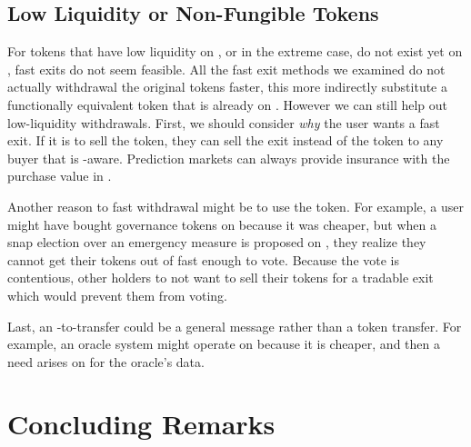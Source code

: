 \subsection{Low Liquidity or Non-Fungible Tokens}

For tokens that have low liquidity on \layerone, or in the extreme case, do not exist yet on \layerone, fast exits do not seem feasible. All the fast exit methods we examined do not actually withdrawal the original tokens faster, this more indirectly substitute a functionally equivalent token that is already on \layerone. However we can still help out low-liquidity withdrawals. First, we should consider \textit{why} the user wants a fast exit. If it is to sell the token, they can sell the exit instead of the token to any buyer that is \layertwo-aware. Prediction markets can always provide insurance with the purchase value in \fail. 

Another reason to fast withdrawal might be to use the token. For example, a user might have bought governance tokens on \layertwo because it was cheaper, but when a snap election over an emergency measure is proposed on \layerone, they realize they cannot get their tokens out of \layertwo fast enough to vote. Because the vote is contentious, other holders to not want to sell their tokens for a tradable exit which would prevent them from voting. 

Last, an \layertwo-to-\layerone transfer could be a general message rather than a token transfer. For example, an oracle system might operate on \layertwo because it is cheaper, and then a need arises on \layerone for the oracle's data. 


\section{Concluding Remarks}







